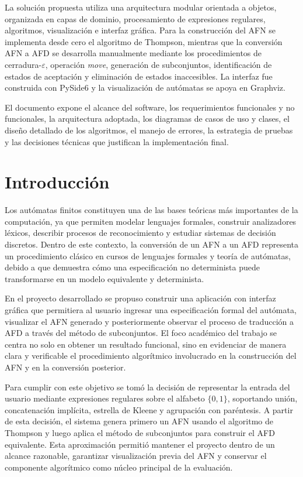\documentclass[12pt]{article}
\begin{document}
La solución propuesta utiliza una arquitectura modular orientada a objetos, organizada en capas de dominio, procesamiento de expresiones regulares, algoritmos, visualización e interfaz gráfica. Para la construcción del AFN se implementa desde cero el algoritmo de Thompson, mientras que la conversión AFN a AFD se desarrolla manualmente mediante los procedimientos de cerradura-$\varepsilon$, operación \textit{move}, generación de subconjuntos, identificación de estados de aceptación y eliminación de estados inaccesibles. La interfaz fue construida con PySide6 y la visualización de autómatas se apoya en Graphviz.

El documento expone el alcance del software, los requerimientos funcionales y no funcionales, la arquitectura adoptada, los diagramas de casos de uso y clases, el diseño detallado de los algoritmos, el manejo de errores, la estrategia de pruebas y las decisiones técnicas que justifican la implementación final.

\newpage

\tableofcontents
\newpage

\section{Introducción}

Los autómatas finitos constituyen una de las bases teóricas más importantes de la computación, ya que permiten modelar lenguajes formales, construir analizadores léxicos, describir procesos de reconocimiento y estudiar sistemas de decisión discretos. Dentro de este contexto, la conversión de un AFN a un AFD representa un procedimiento clásico en cursos de lenguajes formales y teoría de autómatas, debido a que demuestra cómo una especificación no determinista puede transformarse en un modelo equivalente y determinista.

En el proyecto desarrollado se propuso construir una aplicación con interfaz gráfica que permitiera al usuario ingresar una especificación formal del autómata, visualizar el AFN generado y posteriormente observar el proceso de traducción a AFD a través del método de subconjuntos. El foco académico del trabajo se centra no solo en obtener un resultado funcional, sino en evidenciar de manera clara y verificable el procedimiento algorítmico involucrado en la construcción del AFN y en la conversión posterior.

Para cumplir con este objetivo se tomó la decisión de representar la entrada del usuario mediante expresiones regulares sobre el alfabeto $\{0,1\}$, soportando unión, concatenación implícita, estrella de Kleene y agrupación con paréntesis. A partir de esta decisión, el sistema genera primero un AFN usando el algoritmo de Thompson y luego aplica el método de subconjuntos para construir el AFD equivalente. Esta aproximación permitió mantener el proyecto dentro de un alcance razonable, garantizar visualización previa del AFN y conservar el componente algorítmico como núcleo principal de la evaluación.
\end{document}
